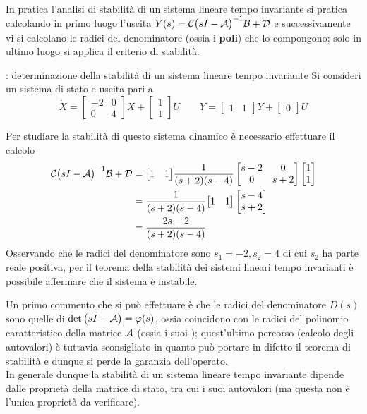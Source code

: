 		\vspace{3mm}
		In pratica l'analisi di stabilità di un sistema lineare tempo invariante si pratica calcolando in primo luogo l'uscita $Y(s) =  \mathcal C \big(sI - \mathcal A\big)^{-1} \mathcal B + \mathcal D $ e successivamente vi si calcolano le radici del denominatore (ossia i \textbf{poli}) che lo compongono; solo in ultimo luogo si applica il criterio di stabilità.
		
		\begin{esempio}{: determinazione della stabilità di un sistema lineare tempo invariante}
			Si consideri un sistema di stato e uscita pari a 
			\[ \dot X = \begin{bmatrix}
				-2 & 0 \\ 0 & 4
			\end{bmatrix} X + \begin{bmatrix}
				1 \\ 1
			\end{bmatrix} U \qquad Y = \begin{bmatrix}
				1  & 1
			\end{bmatrix} Y + \begin{bmatrix} 0
			\end{bmatrix} U\] 
		
			Per studiare la stabilità di questo sistema dinamico è necessario effettuare il calcolo
			\begin{align*}
				\mathcal C \big(sI-\mathcal A\big)^{-1} \mathcal B + \mathcal D & = \big[1 \quad 1\big] \frac 1 {(s+2)(s-4)} \begin{bmatrix}
					s- 2 & 0 \\ 0 & s + 2 
				\end{bmatrix}  \begin{bmatrix}
					1 \\ 1
				\end{bmatrix} \\ & =  \frac 1 {(s+2)(s-4)} \big[1 \quad 1\big] \begin{bmatrix}
					s-4 \\ s+ 2
				\end{bmatrix} \\
				& = \frac{2s - 2}{(s+2)(s-4)}
			\end{align*}
			Osservando che le radici del denominatore sono $s_1 = -2,s_2 = 4$ di cui $s_2$ ha parte reale positiva, per il teorema della stabilità dei sistemi lineari tempo invarianti è possibile affermare che il sistema è instabile.
		\end{esempio}
		
		Un primo commento che si può effettuare è che le radici del denominatore $D(s)$ sono quelle di $\det\big(sI-\mathcal A\big) = \varphi(s)$, ossia coincidono con le radici del polinomio caratteristico della matrice $\mathcal A$ (ossia i suoi ); quest'ultimo percorso (calcolo degli autovalori) è tuttavia sconsigliato in quanto può portare in difetto il teorema di stabilità e dunque si perde la garanzia dell'operato. \\
		In generale dunque la stabilità di un sistema lineare tempo invariante dipende dalle proprietà della matrice di stato, tra cui i suoi autovalori (ma questa non è l'unica proprietà da verificare).
		
